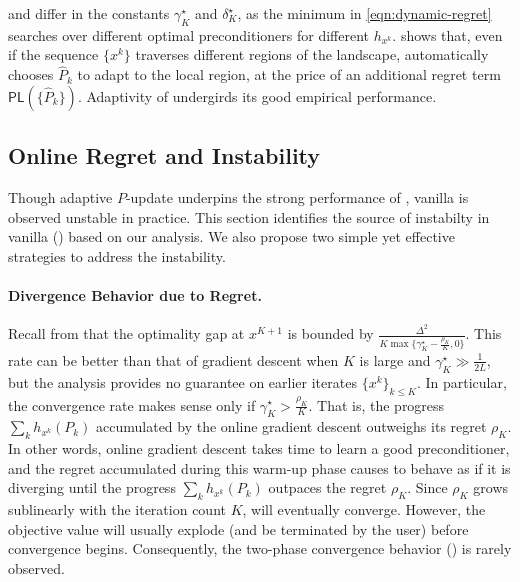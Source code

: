  and  differ in the constants $\gamma_K^\star$ and $\delta_K^\star$, as the minimum in \eqref{eqn:dynamic-regret} searches over different optimal preconditioners for different $h_{x^k}$.  shows that, even if the sequence $\{ x^k \}$ traverses different regions of the landscape, 
{\hdm} automatically chooses $\hat{P}_k$
to adapt to the local region, at the price of an additional regret term $\mathsf{PL}(\{\hat{P}_k\})$. 
Adaptivity of {\hdm} undergirds its good empirical performance.

\subsection{Online Regret and Instability} \label{sec:instability}

Though adaptive $P$-update underpins the strong performance of {\hdm}, vanilla {\hdm} is observed unstable in practice. 
This section identifies the source of instabilty in vanilla {\hdm} () based on our analysis. We also propose two simple yet effective strategies to address the instability.

 
\paragraph{Divergence Behavior due to Regret.} 
Recall from  that the optimality gap at $x^{K + 1}$ is bounded by $\tfrac{\Delta^2}{K \max\{ \gamma_K^{\star} - \frac{\rho_K}{K}, 0 \} }$.
This rate can be better than that of gradient descent when $K$ is large and $\gamma_K^{\star} \gg \tfrac{1}{2L}$, but the analysis provides no guarantee on earlier iterates $\{ x^k \}_{k \leq K}$.
In particular, the convergence rate makes sense only if $\gamma_K^{\star} > \frac{\rho_K}{K}$. That is, the progress $\sum_k h_{x^k} (P_k)$ accumulated by the online gradient descent outweighs its regret $\rho_K$. 
In other words, online gradient descent takes time to learn a good preconditioner, and the regret accumulated during this warm-up phase causes {\hdm} to behave as if it is diverging until the progress $\sum_k h_{x^k} (P_k)$ outpaces the regret $\rho_K$. 
Since $\rho_K$ grows sublinearly with the iteration count $K$, {\hdm} will eventually converge. 
However, the objective value will usually explode (and be terminated by the user) before convergence begins.
Consequently, the two-phase convergence behavior () is rarely observed.

